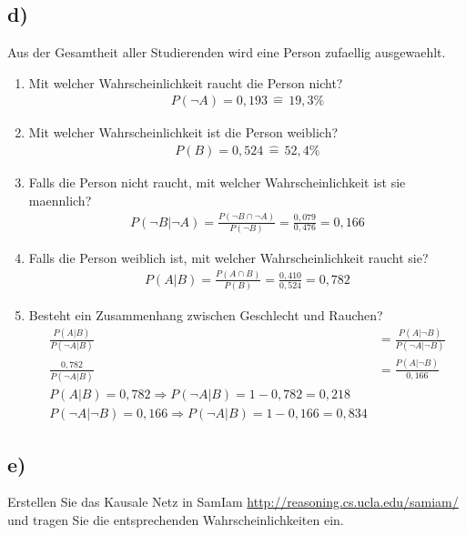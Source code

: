 \documentclass[12pt, a4paper]{article}
\begin{document}
\subsection*{d)}
Aus der Gesamtheit aller Studierenden wird eine Person zufaellig ausgewaehlt.
\begin{enumerate}
\item Mit welcher Wahrscheinlichkeit raucht die Person nicht?\\
\begin{align}
P(\neg A) = 0,193 \, \widehat{=} \, 19,3\%
\end{align}
\item Mit welcher Wahrscheinlichkeit ist die Person weiblich?
\begin{align}
P(B) = 0,524 \, \widehat{=} \, 52,4\%
\end{align}
\item Falls die Person nicht raucht, mit welcher Wahrscheinlichkeit ist sie maennlich?
\begin{align}
P(\neg B | \neg A) = \frac{P(\neg B \cap \neg A)}{P(\neg B)} = \frac{0,079}{0,476} = 0,166
\end{align}
\item Falls die Person weiblich ist, mit welcher Wahrscheinlichkeit raucht sie?
\begin{align}
P(A | B) = \frac{P(A \cap B)}{P(B)} = \frac{0,410}{0,524} = 0,782
\end{align}
\item Besteht ein Zusammenhang zwischen Geschlecht und Rauchen?
\begin{align}
\frac{P(A | B)}{P(\neg A | B)} &= \frac{P(A | \neg B)}{P(\neg A | \neg B)} \\
\frac{0,782}{P(\neg A | B)} &= \frac{P(A | \neg B)}{0,166}
\\
P(A | B) = 0,782 \Rightarrow P(\neg A | B) = 1 - 0,782 = 0,218
\\
P(\neg A | \neg B) = 0,166 \Rightarrow P(\neg A | B) = 1 - 0,166 = 0,834
\end{align}
\end{enumerate}
\subsection*{e)}
Erstellen Sie das Kausale Netz in SamIam \url{http://reasoning.cs.ucla.edu/samiam/} und tragen Sie die entsprechenden Wahrscheinlichkeiten ein.
\vspace{0.3cm}
\end{document}
